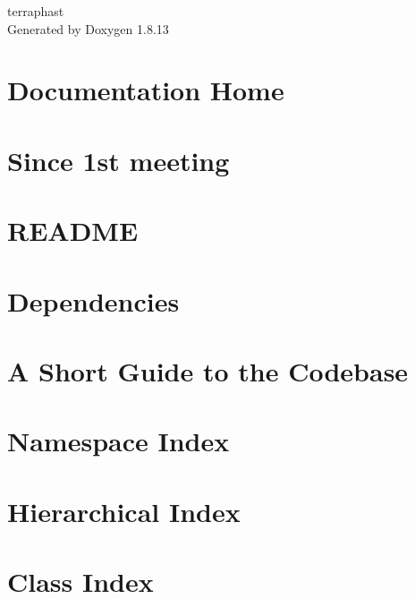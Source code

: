 \documentclass[twoside]{book}
\newcommand{\+}{\discretionary{\mbox{\scriptsize$\hookleftarrow$}}{}{}}
\newcommand{\clearemptydoublepage}{%
  \newpage{\pagestyle{empty}\cleardoublepage}%
}
\begin{document}
\hypersetup{pageanchor=false,
             bookmarksnumbered=true,
             pdfencoding=unicode
            }
\begin{titlepage}
\vspace*{7cm}
\begin{center}%
{\Large terraphast }\\
\vspace*{1cm}
{\large Generated by Doxygen 1.8.13}\\
\end{center}
\end{titlepage}
\clearemptydoublepage
{}
\tableofcontents
\clearemptydoublepage
{}
\hypersetup{pageanchor=true}

\chapter{Documentation Home}
\label{index}\hypertarget{index}{}
\chapter{Since 1st meeting}
\label{md_Changelog}

\chapter{R\+E\+A\+D\+ME}
\label{md_data_README}

\chapter{Dependencies}
\label{md_Dependencies}

\chapter{A Short Guide to the Codebase}
\label{md_documentation_walkthrough}

\chapter{Namespace Index}

\chapter{Hierarchical Index}

\chapter{Class Index}

\end{document}
